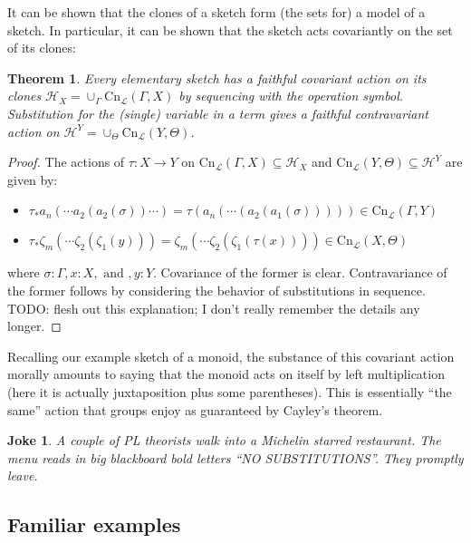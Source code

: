 \documentclass[12pt,twoside]{reedthesis}
\newtheorem{theorem}{Theorem}
\newtheorem{joke}{Joke}
\begin{document}
  It can be shown that the clones of a sketch form (the sets for) a model of a sketch. In particular, it can be shown that the sketch acts covariantly on the set of its clones:
  \begin{theorem}
    Every elementary sketch has a faithful covariant action on its clones
    \(\mathcal{H}_{X} = \cup_{\Gamma} \text{Cn}_{\mathcal{L}}(\Gamma,X)\) by
    sequencing with the operation symbol. Substitution for the (single)
    variable in a term gives a faithful contravariant action on
    \(\mathcal{H}^{Y} = \cup_{\Theta} \text{Cn}_{\mathcal{L}}(Y,\Theta)\).
  \end{theorem}
  \begin{proof}
    The actions of \(\tau : X \rightarrow Y\) on \(\text{Cn}_\mathcal{L}(\Gamma,X) \subseteq \mathcal{H}_{X}\) and \(\text{Cn}_\mathcal{L}(Y,\Theta) \subseteq \mathcal{H}^{Y}\) are given by:
    \begin{itemize}
      \item \(\tau_{*}a_{n}(\cdots a_{2}(a_{2}(\sigma))\cdots) = \tau(a_{n}(\cdots(a_{2}(a_{1}(\sigma))))) \in \text{Cn}_{\mathcal{L}}(\Gamma,Y)\)
      \item \(\tau_{*}\zeta_{m}(\cdots \zeta_{2}(\zeta_{1}(y))) = \zeta_{m}(\cdots\zeta_{2}(\zeta_{1}(\tau(x)))) \in \text{Cn}_{\mathcal{L}}(X,\Theta)\)
    \end{itemize}
    where \(\sigma : \Gamma, x : X, \text { and }, y:Y\). Covariance of the former is
    clear. Contravariance of the former follows by considering the behavior of
    substitutions in sequence. TODO: flesh out this explanation; I don't really
    remember the details any longer.
  \end{proof}

  Recalling our example sketch of a monoid, the substance of this covariant
  action morally amounts to saying that the monoid acts on itself by left
  multiplication (here it is actually juxtaposition plus some parentheses). This
  is essentially ``the same'' action that groups enjoy as guaranteed by Cayley's
  theorem.

  \begin{joke}
    A couple of PL theorists walk into a Michelin starred restaurant. The menu
    reads in big blackboard bold letters ``NO SUBSTITUTIONS''. They promptly
    leave.
  \end{joke}

\subsection{Familiar examples}
\end{document}
